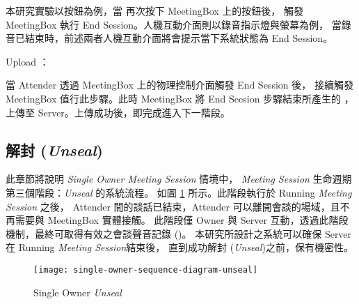 \begin{steps}
            本研究實驗以按鈕為例，當 \DEFattender 再次按下 MeetingBox 上的按鈕後，
        觸發 MeetingBox 執行 End Session。人機互動介面則以錄音指示燈與螢幕為例，
        當錄音已結束時，前述兩者人機互動介面將會提示當下系統狀態為 End Session。

    \item Upload \DEFrecJ：

            當 Attender 透過 MeetingBox 上的物理控制介面觸發 End Session 後，
        接續觸發 MeetingBox 值行此步驟。此時 MeetingBox 將 End Seesion 步驟結束所產生的 \DEFrecJ，
        上傳至 Server。上傳成功後，即完成進入下一階段。
\end{steps}


\subsection{解封 ({\it Unseal})}
\label{subsec.unseal}

    此章節將說明 {\it Single Owner Meeting Session} 情境中，
{\it Meeting Session} 生命週期第三個階段：{\it Unseal} 的系統流程。
如圖 \ref{fig:s-o-unseal} 所示。此階段執行於 Running {\it Meeting Session} 之後，
Attender 間的談話已結束，Attender 可以離開會談的場域，且不再需要與 MeetingBox 實體接觸。
此階段僅 Owner 與 Server 互動，透過此階段機制，最終可取得有效之會談聲音記錄 (\DEFrecREV)。
本研究所設計之系統可以確保 Server 在 Running {\it Meeting Session}結束後，
直到成功解封 ({\it Unseal})之前，\DEFrecREV 保有機密性。

\begin{figure}[H]
    \centering
    \texttt{[image: single-owner-sequence-diagram-unseal]}
    \caption{Single Owner {\it Unseal}}
    \label{fig:s-o-unseal}
\end{figure}

